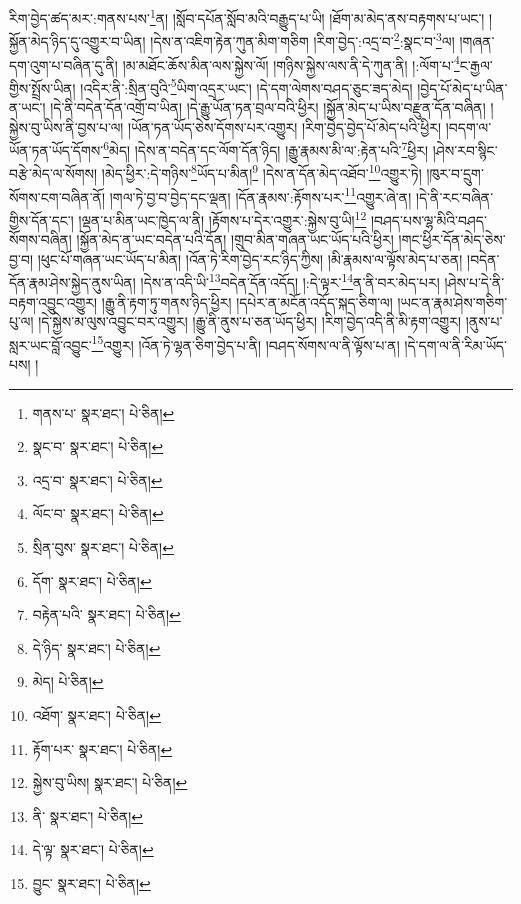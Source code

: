 རིག་བྱེད་ཚད་མར་:གནས་པས་\footnote{གནས་པ་  སྣར་ཐང་།  པེ་ཅིན། }ན། །སློབ་དཔོན་སློབ་མའི་བརྒྱུད་པ་ཡི། །ཐོག་མ་མེད་ནས་བརྟགས་པ་ཡང་། །སྐྱོན་མེད་ཉིད་དུ་འགྱུར་བ་ཡིན། །དེས་ན་འཇིག་རྟེན་ཀུན་མིག་གཅིག །རིག་བྱེད་:འདྲ་བ་\footnote{སྣང་བ་  སྣར་ཐང་།  པེ་ཅིན། }:སྣང་བ་\footnote{འདྲ་བ་  སྣར་ཐང་།  པེ་ཅིན། }ལ། །གཞན་དག་འུག་པ་བཞིན་དུ་ནི། །མ་མཐོང་ཆོས་མིན་ལས་སྐྱེས་ལོ། །གཉིས་སྐྱེས་ལས་ནི་དེ་ཀུན་ནི། །:ལོག་པ་\footnote{ལོང་བ་  སྣར་ཐང་།  པེ་ཅིན། }ང་རྒྱལ་གྱིས་སྤྲོས་ཡིན། །འདིར་ནི་:སྲིན་བུའི་\footnote{སྲིན་བུས་  སྣར་ཐང་།  པེ་ཅིན། }ཡིག་འདྲར་ཡང་། །དེ་དག་ལེགས་བཤད་ཅུང་ཟད་མེད། །བྱེད་པོ་མེད་པ་ཡིན་ན་ཡང་། །དེ་ནི་བདེན་དོན་འགྲོ་བ་ཡིན། །དེ་རྒྱུ་ཡོན་ཏན་བྲལ་བའི་ཕྱིར། །སྐྱོན་མེད་པ་ཡིས་བརྫུན་དོན་བཞིན། །སྐྱེས་བུ་ཡིས་ནི་བྱས་པ་ལ། །ཡོན་ཏན་ཡོད་ཅེས་དོགས་པར་འགྱུར། །རིག་བྱེད་བྱེད་པོ་མེད་པའི་ཕྱིར། །བདག་ལ་ཡོན་ཏན་ཡོད་དོགས་\footnote{དོག་  སྣར་ཐང་།  པེ་ཅིན། }མེད། །དེས་ན་བདེན་དང་ལོག་དོན་ཉིད། །རྒྱུ་རྣམས་མི་ལ་:རྟེན་པའི་\footnote{བརྟེན་པའི་  སྣར་ཐང་།  པེ་ཅིན། }ཕྱིར། །ཤེས་རབ་སྙིང་བརྩེ་མེད་ལ་སོགས། །མེད་ཕྱིར་:དེ་གཉིས་\footnote{དེ་ཉིད་  སྣར་ཐང་།  པེ་ཅིན། }ཡོད་པ་མིན།\footnote{མེད།  པེ་ཅིན། } །དེས་ན་དོན་མེད་འཐོབ་\footnote{འཐོག་  སྣར་ཐང་།  པེ་ཅིན། }འགྱུར་ཏེ། །ཁུར་བ་དྲུག་སོགས་ངག་བཞིན་ནོ། །གལ་ཏེ་བྱ་བ་བྱེད་དང་ལྡན། །དོན་རྣམས་:རྟོགས་པར་\footnote{རྟོག་པར་  སྣར་ཐང་།  པེ་ཅིན། }འགྱུར་ཞེ་ན། །དེ་ནི་རང་བཞིན་གྱིས་དོན་དང་། །ལྡན་པ་མིན་ཡང་ཁྱེད་ལ་ནི། །རྟོགས་པ་དེར་འགྱུར་:སྐྱེས་བུ་ཡི།\footnote{སྐྱེས་བུ་ཡིས།  སྣར་ཐང་།  པེ་ཅིན། } །བཤད་པས་ལྷ་མིའི་བཤད་སོགས་བཞིན། །སྐྱོན་མེད་ན་ཡང་བདེན་པའི་དོན། །གྲུབ་མིན་གཞན་ཡང་ཡོད་པའི་ཕྱིར། །གང་ཕྱིར་དོན་མེད་ཅེས་བྱ་བ། །ཕུང་པོ་གཞན་ཡང་ཡོད་པ་མིན། །འོན་ཏེ་རིག་བྱེད་རང་ཉིད་ཀྱིས། །མི་རྣམས་ལ་ལྟོས་མེད་པ་ཅན། །བདེན་དོན་རྣམ་ཤེས་སྐྱེད་ནུས་ཡིན། །དེས་ན་འདི་ཡི་\footnote{ནི་  སྣར་ཐང་།  པེ་ཅིན། }བདེན་དོན་འདོད། །:དེ་ལྟར་\footnote{དེ་ལྟ་  སྣར་ཐང་།  པེ་ཅིན། }ན་ནི་བར་མེད་པར། །ཤེས་པ་དེ་ནི་བརྟག་འབྱུང་འགྱུར། །རྒྱུ་ནི་རྟག་ཏུ་གནས་ཉིད་ཕྱིར། །དཔེར་ན་མངོན་འདོད་སྐད་ཅིག་ལ། །ཡང་ན་རྣམ་ཤེས་གཅིག་པུ་ལ། །དེ་སྐྱེས་མ་ལུས་འབྱུང་བར་འགྱུར། །རྒྱུ་ནི་ནུས་པ་ཅན་ཡོད་ཕྱིར། །རིག་བྱེད་འདི་ནི་མི་རྟག་འགྱུར། །ནུས་པ་སླར་ཡང་བློ་འབྱུང་\footnote{བྱུང་  སྣར་ཐང་།  པེ་ཅིན། }འགྱུར། །འོན་ཏེ་ལྷན་ཅིག་བྱེད་པ་ནི། །བཤད་སོགས་ལ་ནི་ལྟོས་པ་ན། །དེ་དག་ལ་ནི་རིམ་ཡོད་པས། །
